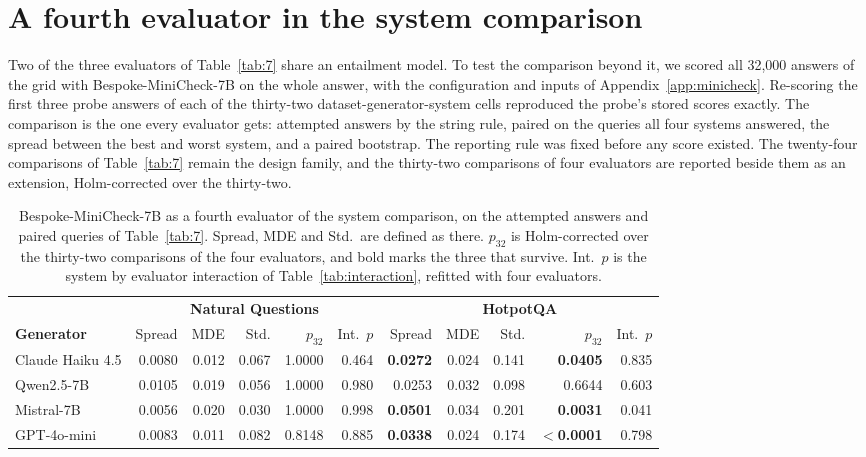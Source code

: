 \documentclass[11pt]{article}
\begin{document}
\section{A fourth evaluator in the system comparison}
\label{app:mcgrid}

Two of the three evaluators of Table~\ref{tab:7} share an entailment model. To test the comparison beyond it, we scored all 32,000 answers of the grid with Bespoke-MiniCheck-7B on the whole answer, with the configuration and inputs of Appendix~\ref{app:minicheck}. Re-scoring the first three probe answers of each of the thirty-two dataset-generator-system cells reproduced the probe's stored scores exactly. The comparison is the one every evaluator gets: attempted answers by the string rule, paired on the queries all four systems answered, the spread between the best and worst system, and a paired bootstrap. The reporting rule was fixed before any score existed. The twenty-four comparisons of Table~\ref{tab:7} remain the design family, and the thirty-two comparisons of four evaluators are reported beside them as an extension, Holm-corrected over the thirty-two.

\begin{table}[t]
\centering
\footnotesize
\setlength{\tabcolsep}{4pt}
\begin{tabular}{lrrrrrrrrrr}
\toprule
 & \multicolumn{5}{c}{\textbf{Natural Questions}} & \multicolumn{5}{c}{\textbf{HotpotQA}} \\
\cmidrule(lr){2-6}\cmidrule(lr){7-11}
\textbf{Generator} & Spread & MDE & Std. & $p_{32}$ & Int.\ $p$ & Spread & MDE & Std. & $p_{32}$ & Int.\ $p$ \\
\midrule
Claude Haiku 4.5 & 0.0080 & 0.012 & 0.067 & 1.0000 & 0.464 & \textbf{0.0272} & 0.024 & 0.141 & \textbf{0.0405} & 0.835 \\
Qwen2.5-7B & 0.0105 & 0.019 & 0.056 & 1.0000 & 0.980 & 0.0253 & 0.032 & 0.098 & 0.6644 & 0.603 \\
Mistral-7B & 0.0056 & 0.020 & 0.030 & 1.0000 & 0.998 & \textbf{0.0501} & 0.034 & 0.201 & \textbf{0.0031} & 0.041 \\
GPT-4o-mini & 0.0083 & 0.011 & 0.082 & 0.8148 & 0.885 & \textbf{0.0338} & 0.024 & 0.174 & \textbf{$<$0.0001} & 0.798 \\
\bottomrule
\end{tabular}
\caption{Bespoke-MiniCheck-7B as a fourth evaluator of the system comparison, on the attempted answers and paired queries of Table~\ref{tab:7}. Spread, MDE and Std.\ are defined as there. $p_{32}$ is Holm-corrected over the thirty-two comparisons of the four evaluators, and bold marks the three that survive. Int.\ $p$ is the system by evaluator interaction of Table~\ref{tab:interaction}, refitted with four evaluators.}
\label{tab:mcgrid}
\end{table}
\end{document}
